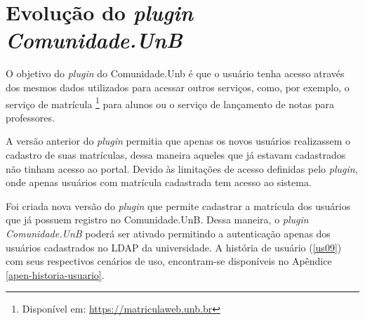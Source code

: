 
\section{Evolução do \textit{plugin Comunidade.UnB}}
\label{plugin-comunidade}

O objetivo do \textit{plugin} do Comunidade.Unb é que o usuário tenha acesso através dos mesmos dados utilizados para acessar outros serviços, como, por exemplo, o serviço de matrícula \footnote{Disponível em: \url{https://matriculaweb.unb.br}} para alunos ou o serviço de lançamento de notas para professores.

A versão anterior do \textit{plugin} permitia que apenas os novos usuários realizassem o cadastro de suas matrículas, dessa maneira aqueles que já estavam cadastrados não tinham acesso ao portal. Devido às limitações de acesso definidas pelo \textit{plugin}, onde apenas usuários com matrícula cadastrada tem acesso ao sistema.

Foi criada nova versão do \textit{plugin} que permite cadastrar a matrícula dos usuários que já possuem registro no Comunidade.UnB. Dessa maneira, o \textit{plugin Comunidade.UnB} poderá ser ativado permitindo a autenticação apenas dos usuários cadastrados no LDAP da universidade. A história de usuário (\ref{us09}) com seus respectivos cenários de uso, encontram-se disponíveis no Apêndice \ref{apen-historia-usuario}.